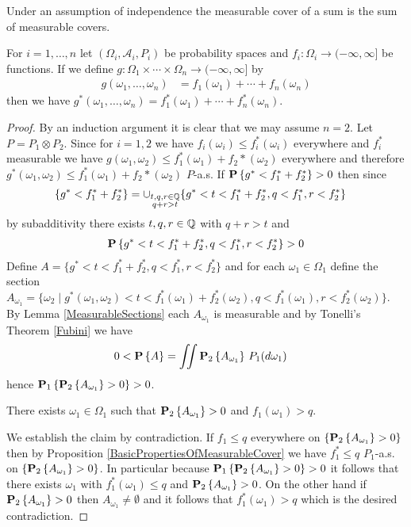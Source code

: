 Under an assumption of independence the measurable cover of a sum is the sum of measurable covers.
\begin{prop}\label{MeasurableCoverSumOfIndependent}For $i=1, \dotsc, n$ let $(\Omega_i, \mathcal{A}_i, P_i)$  be probability spaces and $f_i : \Omega_i \to (-\infty, \infty]$ be functions.  If we define $g : \Omega_1 \times \dotsb \times \Omega_n \to (-\infty, \infty]$ by
\begin{align*}
g(\omega_1, \dotsc, \omega_n) &= f_1(\omega_1) + \dotsb + f_n(\omega_n)
\end{align*}
then we have $g^*(\omega_1, \dotsc, \omega_n) = f^*_1(\omega_1) + \dotsb + f^*_n(\omega_n)$.
\end{prop}
\begin{proof}
By an induction argument it is clear that we may assume $n=2$.  Let $P = P_1 \otimes P_2$.   Since for $i=1,2$ we have $f_i(\omega_i) \leq f_i^*(\omega_i)$ everywhere and $f_i^*$ measurable we have $g(\omega_1, \omega_2) \leq f_1^*(\omega_1) + f_2*(\omega_2)$ everywhere and therefore $g^*(\omega_1, \omega_2) \leq f_1^*(\omega_1) + f_2*(\omega_2)$ $P$-a.s.  If $\probability{g^* < f_1^* + f_2^*}>0$ then since
\begin{align*}
\lbrace g^* < f_1^* + f_2^* \rbrace &= \cup_{\substack{t,q,r \in \rationals \\ q+r > t }} \lbrace g^* < t < f_1^* + f_2^*,  q < f_1^*, r < f_2^* \rbrace
\end{align*}
by subadditivity there exists $t,q,r \in \rationals$ with $q+r > t$ and 
\begin{align*}
\probability{g^* < t < f_1^* + f_2^*,  q < f_1^*, r < f_2^*} > 0
\end{align*}  
Define $A = \lbrace g^* < t < f_1^* + f_2^*,  q < f_1^*, r < f_2^* \rbrace$ and for each $\omega_1 \in \Omega_1$ define the section $A_{\omega_1} = \lbrace \omega_2 \mid g^*(\omega_1, \omega_2) < t < f_1^*(\omega_1) + f_2^*(\omega_2),  q < f_1^*(\omega_1), r < f_2^*(\omega_2) \rbrace$.  By Lemma \ref{MeasurableSections} each $A_{\omega_1}$ is measurable and by Tonelli's Theorem \ref{Fubini} we have
\begin{align*}
0 &< \probability{A} = \iint \sprobability{A_{\omega_1}}{2} \, P_1(d\omega_1)
\end{align*}
hence $\sprobability{\sprobability{A_{\omega_1}}{2} > 0}{1} > 0$.  

\begin{clm}There exists $\omega_1 \in \Omega_1$ such that $\sprobability{A_{\omega_1}}{2} > 0$ and $f_1(\omega_1) > q$.
\end{clm}
We establish the claim by contradiction.  If $f_1 \leq q$ everywhere on $\lbrace \sprobability{A_{\omega_1}}{2} > 0 \rbrace$ then by Proposition \ref{BasicPropertiesOfMeasurableCover} we have $f_1^* \leq q$ $P_1$-a.s. on $\lbrace \sprobability{A_{\omega_1}}{2} > 0 \rbrace$.  In particular because $\sprobability{\sprobability{A_{\omega_1}}{2} > 0}{1} > 0$ it follows that there exists $\omega_1$ with $f^*_1(\omega_1) \leq q$ and $\sprobability{A_{\omega_1}}{2} > 0$.  On the other hand if $\sprobability{A_{\omega_1}}{2} > 0$ then $A_{\omega_1} \neq \emptyset$ and it follows that $f_1^*(\omega_1) > q$ which is the desired contradiction.


\end{proof}
